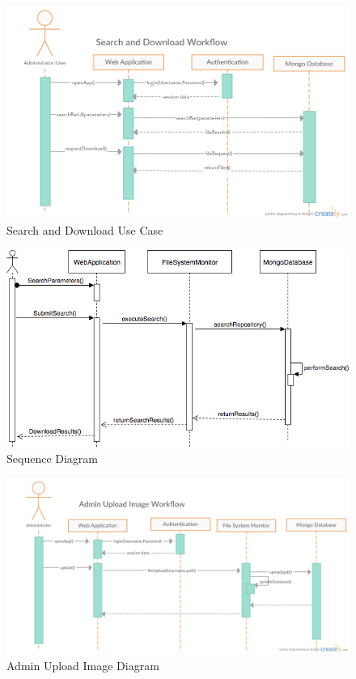 \begin{figure}[h!]
  \begin{center}
    \caption{Search and Download Use Case}
    \includegraphics[width=\textwidth]{images/SearchAndDownload.jpg}
  \end{center}
\end{figure}

\begin{figure}[h!]
  \begin{center}
    \caption{Sequence Diagram}
    \includegraphics[width=\textwidth]{images/SequenceDiagram.jpg}
  \end{center}
\end{figure}

\begin{figure}[h!]
  \begin{center}
    \caption{Admin Upload Image Diagram}
    \includegraphics[width=\textwidth]{images/Upload.jpg}
  \end{center}
\end{figure}

